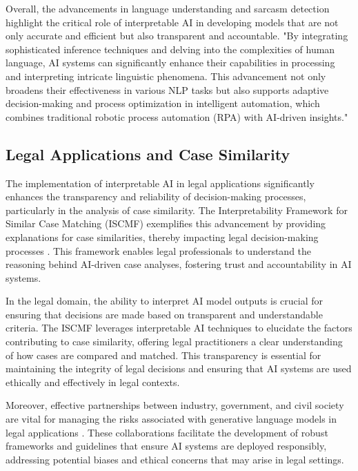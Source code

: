 Overall, the advancements in language understanding and sarcasm detection highlight the critical role of interpretable AI in developing models that are not only accurate and efficient but also transparent and accountable. "By integrating sophisticated inference techniques and delving into the complexities of human language, AI systems can significantly enhance their capabilities in processing and interpreting intricate linguistic phenomena. This advancement not only broadens their effectiveness in various NLP tasks but also supports adaptive decision-making and process optimization in intelligent automation, which combines traditional robotic process automation (RPA) with AI-driven insights." \cite{pandy2024advancementsroboticsprocessautomation}



\subsection{Legal Applications and Case Similarity} \label{subsec:Legal Applications and Case Similarity}



The implementation of interpretable AI in legal applications significantly enhances the transparency and reliability of decision-making processes, particularly in the analysis of case similarity. The Interpretability Framework for Similar Case Matching (ISCMF) exemplifies this advancement by providing explanations for case similarities, thereby impacting legal decision-making processes \cite{lin2023interpretabilityframeworksimilarcase}. This framework enables legal professionals to understand the reasoning behind AI-driven case analyses, fostering trust and accountability in AI systems.



In the legal domain, the ability to interpret AI model outputs is crucial for ensuring that decisions are made based on transparent and understandable criteria. The ISCMF leverages interpretable AI techniques to elucidate the factors contributing to case similarity, offering legal practitioners a clear understanding of how cases are compared and matched. This transparency is essential for maintaining the integrity of legal decisions and ensuring that AI systems are used ethically and effectively in legal contexts.



Moreover, effective partnerships between industry, government, and civil society are vital for managing the risks associated with generative language models in legal applications \cite{mcguffie2020radicalizationrisksgpt3advanced}. These collaborations facilitate the development of robust frameworks and guidelines that ensure AI systems are deployed responsibly, addressing potential biases and ethical concerns that may arise in legal settings.



